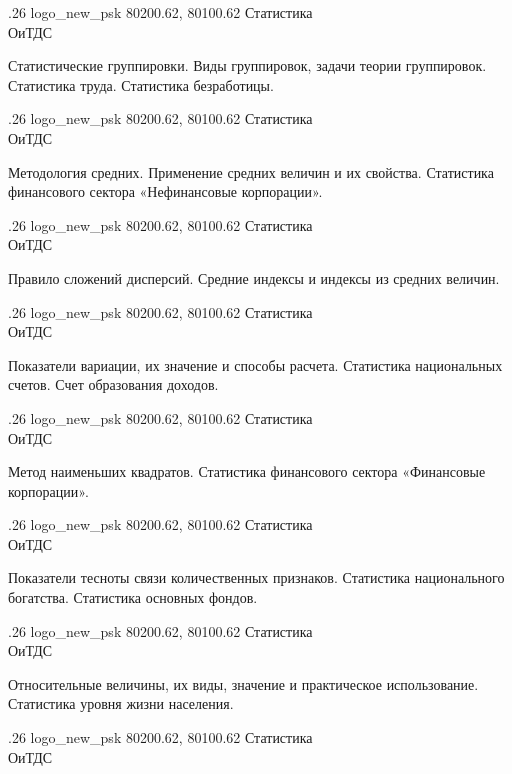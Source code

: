 \documentclass[
	12pt,
	a4paper,
	]
	{article}
\newcommand{\shapkFull}{
	\shapk
		{.26}
		{logo_new_psk}
		{80200.62, 80100.62}
		{Статистика\\}
		{ОиТДС}
		{}
}
\begin{document}
\newpage


\shapkFull
\setcounter{zad}{0}

\z Статистические группировки. Виды группировок, задачи теории группировок.
 \medskip
\z Статистика труда. Статистика безработицы.
 \medskip

\newpage


\shapkFull
\setcounter{zad}{0}

\z Методология средних. Применение средних величин и их свойства.
 \medskip
\z Статистика финансового сектора «Нефинансовые корпорации».
 \medskip

\newpage


\shapkFull
\setcounter{zad}{0}

\z Правило сложений дисперсий.
 \medskip
\z Средние индексы и индексы из средних величин.
 \medskip

\newpage


\shapkFull
\setcounter{zad}{0}

\z Показатели вариации, их значение и способы расчета.
 \medskip
\z Статистика национальных счетов. Счет образования доходов.
 \medskip

\newpage


\shapkFull
\setcounter{zad}{0}

\z Метод наименьших квадратов.
 \medskip
\z Статистика финансового сектора «Финансовые корпорации».
 \medskip

\newpage


\shapkFull
\setcounter{zad}{0}

\z Показатели тесноты связи количественных признаков.
 \medskip
\z Статистика национального богатства. Статистика основных фондов.
 \medskip

\newpage


\shapkFull
\setcounter{zad}{0}

\z Относительные величины, их виды, значение и практическое использование.
 \medskip
\z Статистика уровня жизни населения. \medskip

\newpage


\shapkFull
\setcounter{zad}{0}
\end{document}
